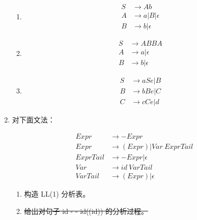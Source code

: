 \documentclass[]{ctexart}
\begin{document}
\begin{enumerate}
\begin{enumerate}
		\item \begin{align*}
		S & \to Ab \\
		A & \to a | B | \epsilon \\
		B & \to b | \epsilon
		\end{align*}
		
		\item \begin{align*}
		S & \to ABBA \\
		A & \to a | \epsilon \\
		B & \to b | \epsilon
		\end{align*}
		
		\item \begin{align*}
		S & \to aSe | B \\
		B & \to bBe | C \\
		C & \to cCe | d
		\end{align*}
		
	\end{enumerate}
	\newpage
	
	\null
	\newpage
		
	\item 对下面文法：
	
	\begin{align*}
	Expr & \to -Expr \\
	Expr & \to (Expr) | Var\ ExprTail \\
	ExprTail & \to -Expr | \epsilon \\
	Var & \to id\ VarTail \\
	VarTail & \to (Expr) | \epsilon
	\end{align*}
	
	\begin{enumerate}
		\item 构造 LL(1) 分析表。
		\item \sout{给出对句子 id - - id((id)) 的分析过程。}
	\end{enumerate}
	
\end{enumerate}
\end{document}
